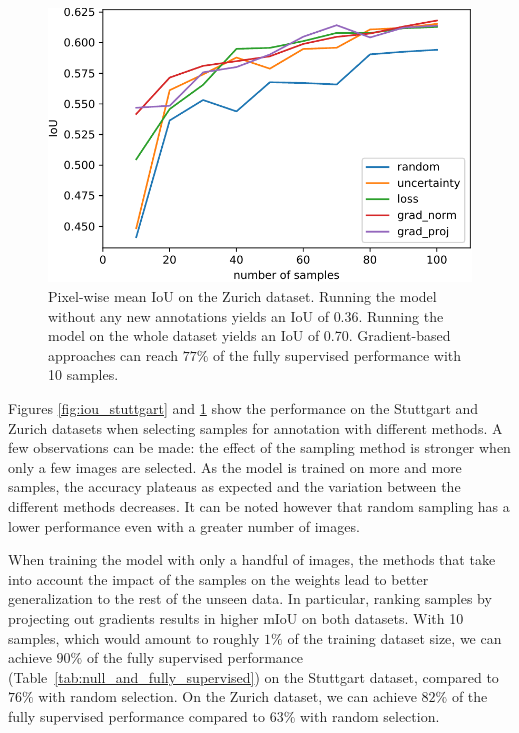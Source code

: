 \documentclass[letterpaper, 10 pt, conference]{ieeeconf}  %
\begin{document}
    \begin{figure}
    \centering
    \includegraphics[width=0.88\linewidth]{pics/pw_iou_zurich-crop.pdf}
   		\caption{Pixel-wise mean IoU on the Zurich dataset. Running the model without any new annotations yields an IoU of $0.36$. Running the model on the whole dataset yields an IoU of 0.70. Gradient-based approaches can reach $77\%$ of the fully supervised performance with 10 samples.}
		\label{fig:iou_zurich}    		
   \end{figure}
   
   
 
Figures \ref{fig:iou_stuttgart} and \ref{fig:iou_zurich} show the performance on the Stuttgart and Zurich datasets when selecting samples for annotation with different methods.  
A few observations can be made: the effect of the sampling method is stronger when only a few images are selected. As the model is trained on more and more samples, the accuracy plateaus as expected and the variation between the different methods decreases. It can be noted however that random sampling has a lower performance even with a greater number of images.

When training the model with only a handful of images, the methods that take into account the impact of the samples on the weights lead to better generalization to the rest of the unseen data. In particular, ranking samples by projecting out gradients results in higher mIoU on both datasets. With 10 samples, which would amount to roughly $1\%$ of the training dataset size, we can achieve $90\%$ of the fully supervised performance (Table~\ref{tab:null_and_fully_supervised}) on the Stuttgart dataset, compared to $76\%$ with random selection. On the Zurich dataset, we can achieve $82\%$ of the fully supervised performance compared to $63\%$ with random selection.
\end{document}
